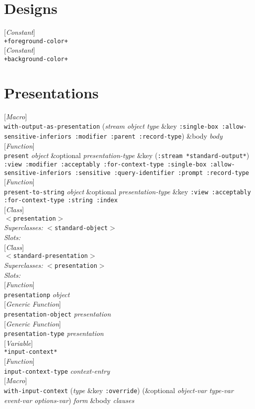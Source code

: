 \documentclass[10pt]{book}
\newenvironment{defother}[2]{[\textit{#1}]\\\texttt{#2}}{\\}
\newenvironment{defun}[1]{\begin{defother}{Function}{#1}}{\end{defother}}
\newenvironment{defgeneric}[1]{\begin{defother}{Generic Function}{#1}}{\end{defother}}
\newenvironment{defmacro}[1]{\begin{defother}{Macro}{#1}}{\end{defother}}
\newenvironment{defvar}[1]{\begin{defother}{Variable}{#1}}{\end{defother}}
\newenvironment{defconstant}[1]{\begin{defother}{Constant}{#1}}{\end{defother}}
\newenvironment{defclass}[2]{[\textit{Class}]\\\texttt{#1}\\\textit{Superclasses:} \texttt{#2}\\\textit{Slots:}}{\\}
\begin{document}
\section{Designs}
\begin{defconstant}{+foreground-color+}\end{defconstant}
\begin{defconstant}{+background-color+}\end{defconstant}
\section{Presentations}
\begin{defmacro}{with-output-as-presentation} (\textit{stream object type} \&key \texttt{:single-box :allow-sensitive-inferiors :modifier :parent :record-type}) \&body \textit{body}\end{defmacro}
\begin{defun}{present} \textit{object} \&optional \textit{presentation-type} \&key (\texttt{:stream *standard-output*}) \texttt{:view :modifier :acceptably :for-context-type :single-box :allow-sensitive-inferiors :sensitive :query-identifier :prompt :record-type}\end{defun}
\begin{defun}{present-to-string} \textit{object} \&optional \textit{presentation-type} \&key \texttt{:view :acceptably :for-context-type :string :index}\end{defun}
\begin{defclass}{$<$presentation$>$}{$<$standard-object$>$}\end{defclass}
\begin{defclass}{$<$standard-presentation$>$}{$<$presentation$>$}\end{defclass}
\begin{defun}{presentationp} \textit{object}\end{defun}
\begin{defgeneric}{presentation-object} \textit{presentation}\end{defgeneric}
\begin{defgeneric}{presentation-type} \textit{presentation}\end{defgeneric}
\begin{defvar}{*input-context*}\end{defvar}
\begin{defun}{input-context-type} \textit{context-entry}\end{defun}
\begin{defmacro}{with-input-context} (\textit{type} \&key \texttt{:override}) (\&optional \textit{object-var type-var event-var options-var}) \textit{form} \&body \textit{clauses}\end{defmacro}
\end{document}
